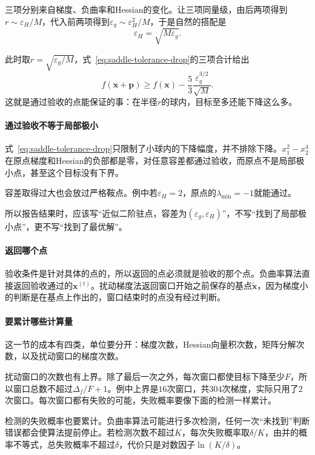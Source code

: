 三项分别来自梯度、负曲率和Hessian的变化。让三项同量级，由后两项得到$r\sim\varepsilon_H/M$，代入前两项得到$\varepsilon_g\sim\varepsilon_H^2/M$，于是自然的搭配是
\begin{equation}
 \varepsilon_H=\sqrt{M\varepsilon_g}.
 \label{eq:saddle-tolerance-scale}
\end{equation}

此时取$r=\sqrt{\varepsilon_g/M}$，式~\eqref{eq:saddle-tolerance-drop}的三项合计给出
\[
 f(\bm{x}+\bm{p})\geq f(\bm{x})-\frac{5}{3}\frac{\varepsilon_g^{3/2}}{\sqrt{M}}.
\]
这就是通过验收的点能保证的事：在半径$r$的球内，目标至多还能下降这么多。

\paragraph{通过验收不等于局部极小}
式~\eqref{eq:saddle-tolerance-drop}只限制了小球内的下降幅度，并不排除下降。$x_1^2-x_2^4$在原点梯度和Hessian的负部都是零，对任意容差都通过验收，而原点不是局部极小点，甚至这个目标没有下界。

容差取得过大也会放过严格鞍点。例中若$\varepsilon_H=2$，原点的$\lambda_{\min}=-1$就能通过。

所以报告结果时，应该写“近似二阶驻点，容差为$(\varepsilon_g,\varepsilon_H)$”，不写“找到了局部极小点”，更不写“找到了最优解”。

\paragraph{返回哪个点}
验收条件是针对具体的点的，所以返回的点必须就是验收的那个点。负曲率算法直接返回验收通过的$\bm{x}^{(t)}$。扰动梯度法返回窗口开始之前保存的基点$\tilde{\bm{x}}$，因为梯度小的判断是在基点上作出的，窗口结束时的点没有经过判断。

\paragraph{要累计哪些计算量}
这一节的成本有四类，单位要分开：梯度次数，Hessian向量积次数，矩阵分解次数，以及扰动窗口的梯度次数。

扰动窗口的次数也有上界。除了最后一次之外，每次窗口都使目标下降至少$F$，所以窗口总数不超过$\Delta_f/F+1$。例中上界是$16$次窗口，共$304$次梯度，实际只用了$2$次窗口。每次窗口都有失败的可能，失败概率要像下面的检测一样累计。

检测的失败概率也要累计。负曲率算法可能进行多次检测，任何一次“未找到”判断错误都会使算法提前停止。若检测次数不超过$K$，每次失败概率取$\delta/K$，由并的概率不等式，总失败概率不超过$\delta$，代价只是对数因子$\ln(K/\delta)$。

